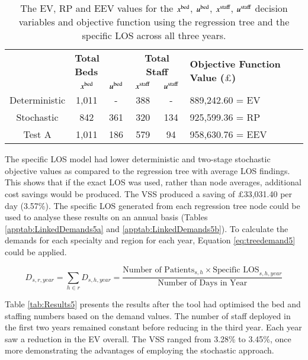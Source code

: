 \documentclass[../thesis.tex]{subfiles}
\begin{document}
\begin{table}[h!]
    \centering
    \begin{tabular}{cccccl}\toprule
 & \multicolumn{2}{l}{\textbf{Total Beds}} & \multicolumn{2}{c}{\textbf{Total Staff}} & \multirow{2}{*}{\textbf{Objective Function Value ($\pounds$)}}\\ \cmidrule(lr){2-3} \cmidrule(lr){4-5}
 & $x^\textnormal{bed}$           & $u^\textnormal{bed}$          & $x^\textnormal{staff}$         & $u^\textnormal{staff}$         \\ \midrule
    Deterministic      & 1,011 & - & 388 & - & 889,242.60 = EV \\ \midrule
    Stochastic &842&361 & 320 & 134&  925,599.36 = RP \\ \midrule
    Test A & 1,011 & 186 & 579 & 94 & 958,630.76 = EEV \\\bottomrule
    \end{tabular}
    \caption{The EV, RP and EEV values for the $x^\textnormal{bed}$, $u^\textnormal{bed}$, $x^\textnormal{staff}$, $u^\textnormal{staff}$ decision variables and objective function using the regression tree and the specific LOS across all three years.}
    \label{tab:Results4}
\end{table}
The specific LOS model had lower deterministic and two-stage stochastic objective values as compared to the regression tree with average LOS findings. This shows that if the exact LOS was used, rather than node averages, additional cost savings would be produced. The VSS produced a saving of $\pounds$33,031.40 per day (3.57\%). The specific LOS generated from each regression tree node could be used to analyse these results on an annual basis (Tables \ref{apptab:LinkedDemands5a} and \ref{apptab:LinkedDemands5b}). To calculate the demands for each specialty and region for each year, Equation \eqref{eq:treedemand5} could be applied.

\begin{equation}\label{eq:treedemand5}
        D_{s,r,year} = \sum\limits_{h \in r} D_{s,h,year} = \frac{\text{Number of Patients}_{s,h}\times{\text{Specific LOS}_{s,h,year}}}{{\text{Number of Days in Year}}}
\end{equation}

Table \ref{tab:Results5} presents the results after the tool had optimised the bed and staffing numbers based on the demand values. The number of staff deployed in the first two years remained constant before reducing in the third year. Each year saw a reduction in the EV overall. The VSS ranged from 3.28\% to 3.45\%, once more demonstrating the advantages of employing the stochastic approach.
\end{document}
